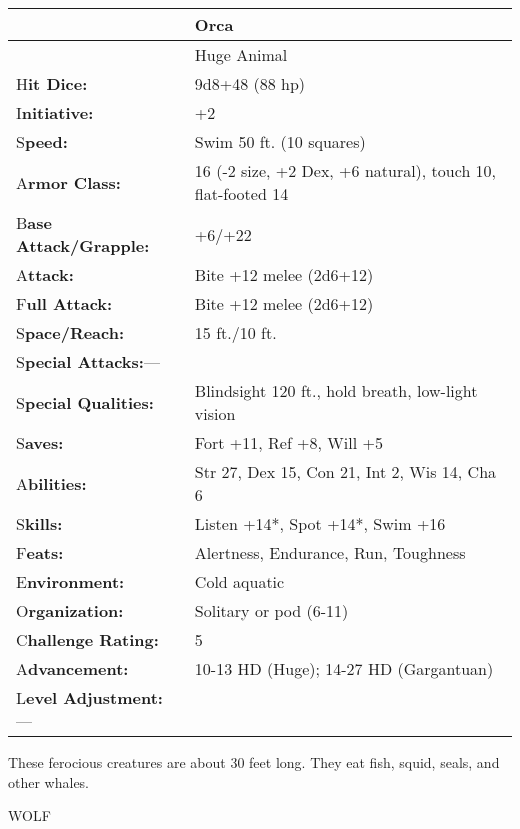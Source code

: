 \documentclass{article}
\begin{document}
\vspace{12pt}
\begin{tabular}{|>{\raggedright}p{91pt}|>{\raggedright}p{226pt}|}
\hline
 & Orca\tabularnewline
\hline
 & Huge Animal\tabularnewline
\hline
H\textbf{it Dice:} & 9d8+48 (88 hp)\tabularnewline
\hline
I\textbf{nitiative:} & +2\tabularnewline
\hline
S\textbf{peed:} & Swim 50 ft. (10 squares)\tabularnewline
\hline
A\textbf{rmor Class:} & 16 (-2 size, +2 Dex, +6 natural), touch 10, flat-footed 
14\tabularnewline
\hline
B\textbf{ase Attack/Grapple:} & +6/+22\tabularnewline
\hline
A\textbf{ttack:} & Bite +12 melee (2d6+12)\tabularnewline
\hline
F\textbf{ull Attack:} & Bite +12 melee (2d6+12)\tabularnewline
\hline
S\textbf{pace/Reach:} & 15 ft./10 ft.\tabularnewline
\hline
S\textbf{pecial Attacks:}--- & \tabularnewline
\hline
S\textbf{pecial Qualities:} & Blindsight 120 ft., hold breath, low-light vision\tabularnewline
\hline
S\textbf{aves:} & Fort +11, Ref +8, Will +5\tabularnewline
\hline
A\textbf{bilities:} & Str 27, Dex 15, Con 21, Int 2, Wis 14, Cha 6\tabularnewline
\hline
S\textbf{kills:} & Listen +14*, Spot +14*, Swim +16\tabularnewline
\hline
F\textbf{eats:} & Alertness, Endurance, Run, Toughness\tabularnewline
\hline
E\textbf{nvironment:} & Cold aquatic\tabularnewline
\hline
O\textbf{rganization:} & Solitary or pod (6-11)\tabularnewline
\hline
C\textbf{hallenge Rating:} & 5\tabularnewline
\hline
A\textbf{dvancement:} & 10-13 HD (Huge); 14-27 HD (Gargantuan)\tabularnewline
\hline
L\textbf{evel Adjustment:}--- & \tabularnewline
\hline
\end{tabular}

These ferocious creatures are about 30 feet long. They eat fish, squid, seals, 
and other whales.

\vspace{12pt}
WOLF
\end{document}
